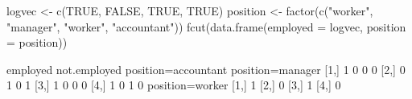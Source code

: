 \begin{Schunk}
% --begin: "fcut.logfact"
\begin{Sinput}
 logvec <- c(TRUE, FALSE, TRUE, TRUE)
 position <- factor(c("worker", "manager", "worker", "accountant"))
 fcut(data.frame(employed = logvec, position = position))
\end{Sinput}
\begin{Soutput}
     employed not.employed position=accountant position=manager
[1,]        1            0                   0                0
[2,]        0            1                   0                1
[3,]        1            0                   0                0
[4,]        1            0                   1                0
     position=worker
[1,]               1
[2,]               0
[3,]               1
[4,]               0
\end{Soutput}
%
% --end: "fcut.logfact"
\end{Schunk}
